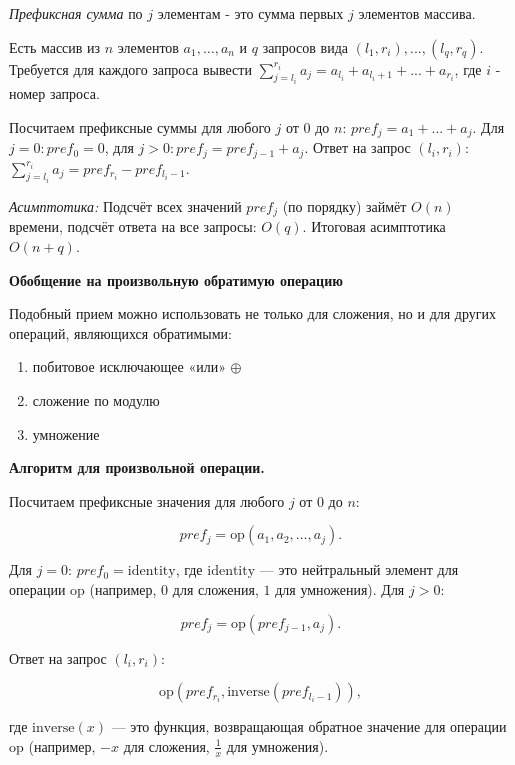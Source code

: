 \Def \textit{Префиксная сумма} по $j$ элементам - это сумма первых $j$ элементов массива. 

\Task Есть массив из $n$ элементов $a_1, \ldots, a_n$ и $q$ запросов вида $(l_1, r_i), ..., (l_q, r_q)$. Требуется для каждого запроса вывести $\sum\limits_{j = l_i}^{r_i}a_j = a_{l_i} + a_{l_i + 1} + ... + a_{r_i}$, где $i$ - номер запроса. 

\Alg Посчитаем префиксные суммы для любого $j$ от $0$ до $n$: $pref_j = a_1 + ... + a_j$. Для $j = 0: pref_0 = 0$, для $j > 0: pref_j = pref_{j-1} + a_j$. Ответ на запрос $(l_i, r_i):$ $\sum\limits_{j = l_i}^{r_i}a_j = pref_{r_i} - pref_{l_i - 1}$.

\textit{Асимптотика:} Подсчёт всех значений $pref_j$ (по порядку) займёт $O(n)$ времени, подсчёт ответа на все запросы: $O(q)$. Итоговая асимптотика $O(n + q)$. 

\textbf{Обобщение на произвольную обратимую операцию}

Подобный прием можно использовать не только для сложения, но и для других операций, являющихся обратимыми:
\begin{enumerate}
    \item побитовое исключающее «или» $\oplus$
    \item сложение по модулю
    \item умножение
\end{enumerate}

\textbf{Алгоритм для произвольной операции.}

Посчитаем префиксные значения для любого $j$ от $0$ до $n$: 

$$pref_j = \text{op}(a_1, a_2, \ldots, a_j).$$

Для $j = 0$: $pref_0 = \text{identity}$, где $\text{identity}$ — это нейтральный элемент для операции $\text{op}$ (например, $0$ для сложения, $1$ для умножения). Для $j > 0$: 

$$pref_j = \text{op}(pref_{j-1}, a_j).$$

Ответ на запрос $(l_i, r_i)$: 

$$\text{op}\left(pref_{r_i}, \text{inverse}(pref_{l_i - 1})\right),$$

где $\text{inverse}(x)$ — это функция, возвращающая обратное значение для операции $\text{op}$ (например, $-x$ для сложения, $\frac{1}{x}$ для умножения).

\pagebreak